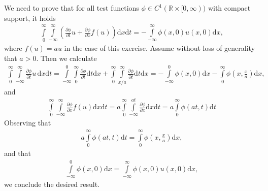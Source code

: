 \documentclass[10pt,letterpaper]{article}
\theoremstyle{break}
\begin{document}
\begin{solution}
    We need to prove that for all test functions $\phi \in C^1(\mathbb{R} \times [0,\infty))$
    with compact support, it holds 
    \begin{align}
    	\int\limits_{0}^{\infty}
    	\int\limits_{-\infty}^{\infty}
    	\left(
    		\frac{\partial \phi}{\partial t}
    		u
    		+
    		\frac{\partial \phi}{\partial x}
    		f(u)
    	\right)
    	\text{d}x \text{d} t
    	=
    	-
    	\int\limits_{-\infty}^{\infty}
    	\phi(x,0) u(x,0)
    	\text{d}x,
    \end{align}
    where $f(u) = au$ in the case of this exercise.
    Assume without loss of generality that $a>0$.
    Then we calculate 
    \begin{align}
    	\int\limits_{0}^{\infty}
    	\int\limits_{-\infty}^{\infty}
    	\frac{\partial \phi}{\partial t}
    	u \,
    	\text{d}x \text{d} t
    	=
    	\int\limits_{-\infty}^{0}
    	\int\limits_{0}^{\infty}
    	\frac{\partial \phi}{\partial t}
    	\text{d}t \text{d} x
    	+
    	\int\limits_{0}^{\infty}
    	\int\limits_{x/a}^{\infty}
    	\frac{\partial \phi}{\partial t}
    	\text{d}t \text{d} x
    	=
    	-
    	\int\limits_{-\infty}^{0}
    	\phi(x,0)
    	\text{d} x
    	-
    	\int\limits_{0}^{\infty}
    	\phi
    	\left(x,\frac{x}{a}\right)
    	\text{d} x,
    \end{align}
    and
    \begin{align}
    	\int\limits_{0}^{\infty}
    	\int\limits_{-\infty}^{\infty}
    	\frac{\partial \phi}{\partial x}
    	f(u)
    	\text{d}x \text{d} t
    	=
    	a
    	\int\limits_{0}^{\infty}
    	\int\limits_{-\infty}^{at}
    	\frac{\partial \phi}{\partial x}
    	\text{d}x \text{d} t
    	=
    	a
    	\int\limits_{0}^{\infty}
    	\phi
    	\left(at,t\right)
    	\text{d}t
    \end{align}
    Observing that
    \begin{align}
    	a
    	\int\limits_{0}^{\infty}
    	\phi
    	\left(at,t\right)
    	\text{d}t
    	=
    	\int\limits_{0}^{\infty}
    	\phi
    	\left(x,\frac{x}{a}\right)
    	\text{d} x,
    \end{align}
    and that
    \begin{align}
    	\int\limits_{-\infty}^{0}
    	\phi(x,0)
    	\text{d} x
    	=
    	\int\limits_{-\infty}^{\infty}
    	\phi(x,0)
    	u(x,0)
    	\text{d} x,
    \end{align}
    we conclude the desired result.
\end{solution}
\end{document}
